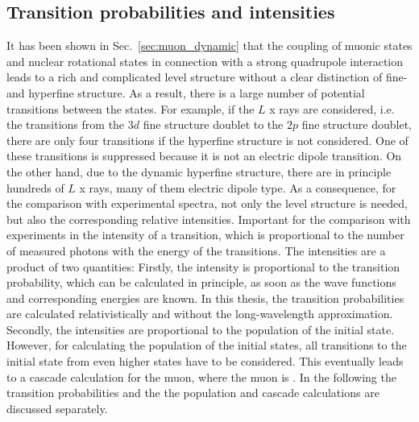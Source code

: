 \subsection{Transition probabilities and intensities}
\label{sec:transitions}
It has been shown in Sec.~\ref{sec:muon_dynamic} that the coupling of muonic states and nuclear rotational states in connection with a strong quadrupole interaction leads to a rich and complicated level structure without a clear distinction of fine- and hyperfine structure. As a result, there is a large number of potential transitions between the states. For example, if the $L$ x rays are considered, i.e. the transitions from the $3d$ fine structure doublet to the $2p$ fine structure doublet, there are only four transitions if the hyperfine structure is not considered. One of these transitions is suppressed because it is not an electric dipole transition. On the other hand, due to the dynamic hyperfine structure, there are in principle hundreds of $L$ x rays, many of them electric dipole type. As a consequence, for the comparison with experimental spectra, not only the level structure is needed, but also the corresponding relative intensities. Important for the comparison with experiments in the intensity of a transition, which is proportional to the number of measured photons with the energy of the transitions. The intensities are a product of two quantities:
Firstly, the intensity is proportional to the transition probability, which can be calculated in principle, as soon as the wave functions and corresponding energies are known. In this thesis, the transition probabilities are calculated relativistically and without the long-wavelength approximation.
Secondly, the intensities are proportional to the population of the initial state. However, for calculating the population of the initial states, all transitions to the initial state from even higher states have to be considered. This eventually leads to a cascade calculation for the muon, where the muon is . In the following the transition probabilities and the the population and cascade calculations are discussed separately.\\

